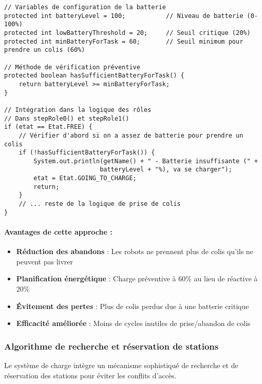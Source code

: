 \documentclass[12pt,a4paper]{article}
\begin{document}
\begin{lstlisting}[caption=Vérification préventive de batterie avant prise de colis]
// Variables de configuration de la batterie
protected int batteryLevel = 100;           // Niveau de batterie (0-100%)
protected int lowBatteryThreshold = 20;     // Seuil critique (20%)
protected int minBatteryForTask = 60;       // Seuil minimum pour prendre un colis (60%)

// Méthode de vérification préventive
protected boolean hasSufficientBatteryForTask() {
    return batteryLevel >= minBatteryForTask;
}

// Intégration dans la logique des rôles
// Dans stepRole0() et stepRole1()
if (etat == Etat.FREE) {
    // Vérifier d'abord si on a assez de batterie pour prendre un colis
    if (!hasSufficientBatteryForTask()) {
        System.out.println(getName() + " - Batterie insuffisante (" +
                          batteryLevel + "%), va se charger");
        etat = Etat.GOING_TO_CHARGE;
        return;
    }
    // ... reste de la logique de prise de colis
}
\end{lstlisting}

\paragraph{Avantages de cette approche :}
\begin{itemize}
    \item \textbf{Réduction des abandons} : Les robots ne prennent plus de colis qu'ils ne peuvent pas livrer
    \item \textbf{Planification énergétique} : Charge préventive à 60\% au lieu de réactive à 20\%
    \item \textbf{Évitement des pertes} : Plus de colis perdus due à une batterie critique
    \item \textbf{Efficacité améliorée} : Moins de cycles inutiles de prise/abandon de colis
\end{itemize}

\subsubsection{Algorithme de recherche et réservation de stations}

Le système de charge intègre un mécanisme sophistiqué de recherche et de réservation des stations pour éviter les conflits d'accès.
\end{document}
